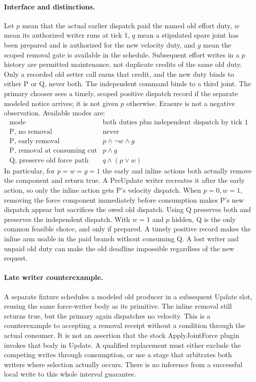 \documentclass{article}
\begin{document}
\paragraph{Interface and distinctions.}
Let \(p\) mean that the actual earlier dispatch paid the named old
effort duty, \(w\) mean its authorized writer runs at tick 1,
\(q\) mean a stipulated spare joint has been prepared and is
authorized for the new velocity duty, and \(g\) mean the scoped
removal gate is available in the schedule. Subsequent effort writes
in a \(p\) history are permitted maintenance, not duplicate credits
of the same old duty. Only a recorded old setter call earns that
credit, and the new duty binds to either P or Q, never both.
The independent command binds to a third joint. The primary chooser
sees a timely, scoped positive dispatch record if the separate
modeled notice arrives; it is not given \(p\) otherwise.
Erasure is not a negative observation. Available modes are:
\[
\begin{array}{c|c}
\text{mode}&\text{both duties plus independent dispatch by tick 1}\\\hline
\text{P, no removal}&\text{never}\\
\text{P, early removal}&p\land\neg w\land g\\
\text{P, removal at consuming cut}&p\land g\\
\text{Q, preserve old force path}&q\land(p\lor w)
\end{array}
\]
In particular, for \(p=w=g=1\) the early and inline actions
both actually remove the component and return true. A PreUpdate
writer recreates it after the early action, so only the inline
action gets P's velocity dispatch. When \(p=0,w=1\), removing
the force component immediately before consumption makes P's
new dispatch appear but sacrifices the owed old dispatch. Using
Q preserves both and preserves the independent dispatch. With \(w=1\) and \(p\) hidden,
Q is the only common feasible choice, and only if prepared.
A timely positive record makes the inline arm usable in the paid
branch without consuming Q. A lost writer and unpaid old duty
can make the old deadline impossible regardless of the new request.

\paragraph{Late writer counterexample.}
A separate fixture schedules a modeled old producer in a subsequent
Update slot, reusing the same force-writer body as its primitive.
The inline removal still returns true, but the primary again
dispatches no velocity. This is a counterexample to accepting
a removal receipt without a condition through the actual consumer.
It is not an assertion that the stock ApplyJointForce plugin
invokes that body in Update. A qualified replacement must either
exclude the competing writes through consumption, or use a stage
that arbitrates both writers where selection actually occurs.
There is no inference from a successful local write to this
whole interval guarantee.
\end{document}
